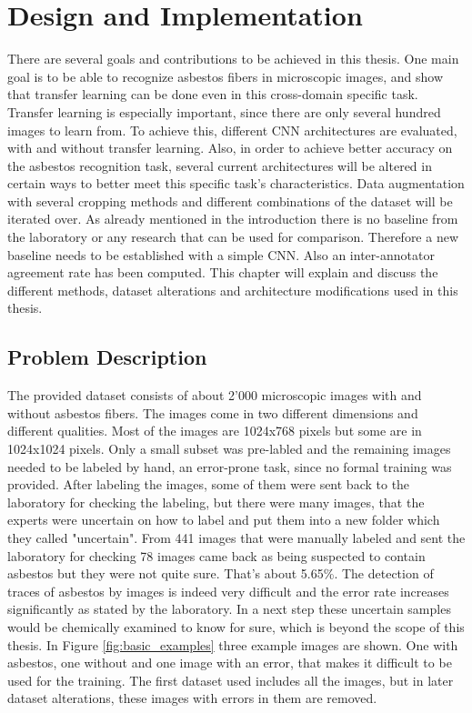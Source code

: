 \chapter{Design and Implementation}


There are several goals and contributions to be achieved in this thesis. One main goal is to be able to recognize asbestos fibers in microscopic images, and show that transfer learning can be done even in this cross-domain specific task. Transfer learning is especially important, since there are only several hundred images to learn from. To achieve this, different CNN architectures are evaluated, with and without transfer learning. Also, in order to achieve better accuracy on the asbestos recognition task, several current architectures will be altered in certain ways to better meet this specific task's characteristics. Data augmentation with several cropping methods and different combinations of the dataset will be iterated over. As already mentioned in the introduction there is no baseline from the laboratory or any research that can be used for comparison. Therefore a new baseline needs to be established with a simple CNN. Also an inter-annotator agreement rate has been computed. This chapter will explain and discuss the different methods, dataset alterations and architecture modifications used in this thesis. 

\section{Problem Description}

The provided dataset consists of about 2'000 microscopic images with and without asbestos fibers. The images come in two different dimensions and different qualities. Most of the images are 1024x768 pixels but some are in 1024x1024 pixels. Only a small subset was pre-labled and the remaining images needed to be labeled by hand, an error-prone task, since no formal training was provided. After labeling the images, some of them were sent back to the laboratory for checking the labeling, but there were many images, that the experts were uncertain on how to label and put them into a new folder which they called  "uncertain". From 441 images that were manually labeled and sent the laboratory for checking 78 images came back as being suspected to contain asbestos but they were not quite sure. That's about 5.65\%. The detection of traces of asbestos by images is indeed very difficult and the error rate increases significantly as stated by the laboratory. In a next step these uncertain samples would be chemically examined to know for sure, which is beyond the scope of this thesis. In Figure \ref{fig:basic_examples} three example images are shown. One with asbestos, one without and one image with an error, that makes it difficult to be used for the training. The first dataset used includes all the images, but in later dataset alterations, these images with errors in them are removed.


